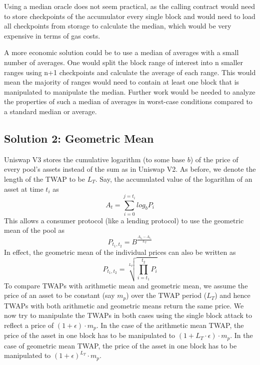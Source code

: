 Using a median oracle does not seem practical, as the calling contract would need to store checkpoints of the accumulator every single block and would need to load all checkpoints from storage to calculate the median, which would be very expensive in terms of gas costs.

A more economic solution could be to use a median of averages with a small number of averages. One would split the block range of interest into n smaller ranges using n+1 checkpoints and calculate the average of each range. This would mean the majority of ranges would need to contain at least one block that is manipulated to manipulate the median. Further work would be needed to analyze the properties of such a median of averages in worst-case conditions compared to a standard median or average.

\subsection{Solution 2: Geometric Mean \label{sectionPotentialSolution2}}
Uniswap V3 stores the cumulative logarithm (to some base $b$) of the price of every pool's assets instead of the sum as in Uniswap V2. As before, we denote the length of the TWAP to be $L_T$. Say, the accumulated value of the logarithm of an asset at time $t_i$ as $$A_{t} = \sum_{i = 0}^{j = t_i}log_{b}P_i$$ This allows a consumer protocol (like a lending protocol) to use the geometric mean of the pool as
$$P_{{t_1},{t_2}} = B^{\frac{A_{t_2} - A_{t_1}}{L_T}}$$
In effect, the geometric mean of the individual prices can also be written as
$$P_{{t_1},{t_2}} = \sqrt[L_T]{\prod_{i=t_1}^{t_2} P_i}$$
To compare TWAPs with arithmetic mean and geometric mean, we assume the price of an asset to be constant (say $m_p$) over the TWAP period ($L_T$) and hence TWAPs with both arithmetic and geometric means return the same price. We now try to manipulate the TWAPs in both cases using the single block attack to reflect a price of $(1 + \epsilon)\cdot m_p$. In the case of the arithmetic mean TWAP, the price of the asset in one block has to be manipulated to $(1 + L_T \cdot \epsilon)\cdot m_p$. In the case of geometric mean TWAP, the price of the asset in one block has to be manipulated to $(1+\epsilon)^{L_T}\cdot m_p$.

